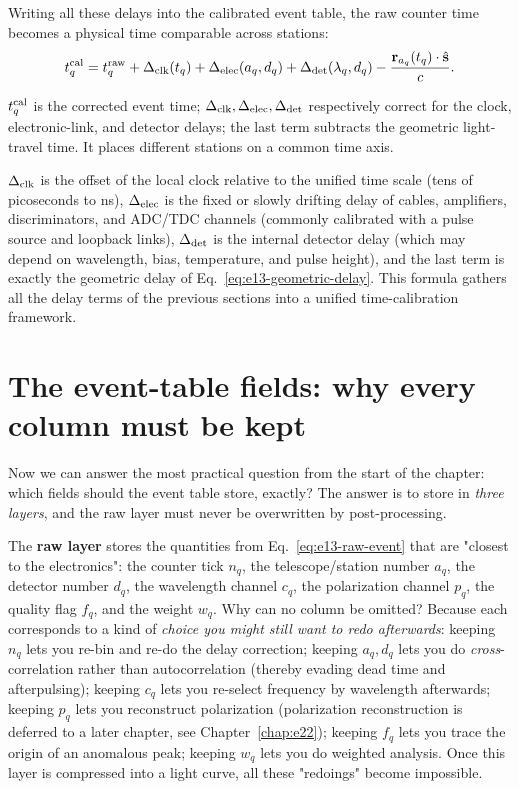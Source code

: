 Writing all these delays into the calibrated event table, the raw counter time becomes a physical time comparable across stations:
\begin{equation}
  t^{\rm cal}_q =
  t^{\rm raw}_q
  +\Delta_{\rm clk}(t_q)
  +\Delta_{\rm elec}(a_q,d_q)
  +\Delta_{\rm det}(\lambda_q,d_q)
  -\frac{\mathbf{r}_{a_q}(t_q)\cdot\hat{\mathbf{s}}}{c}.
  \label{eq:e13-calibrated-time}
\end{equation}
\begin{formulaexplain}
$t_q^{\rm cal}$ is the corrected event time; $\Delta_{\rm clk},\Delta_{\rm elec},\Delta_{\rm det}$ respectively correct for the clock, electronic-link, and detector delays; the last term subtracts the geometric light-travel time. It places different stations on a common time axis.
\end{formulaexplain}
$\Delta_{\rm clk}$ is the offset of the local clock relative to the unified time scale (tens of picoseconds to ns), $\Delta_{\rm elec}$ is the fixed or slowly drifting delay of cables, amplifiers, discriminators, and ADC/TDC channels (commonly calibrated with a pulse source and loopback links), $\Delta_{\rm det}$ is the internal detector delay (which may depend on wavelength, bias, temperature, and pulse height), and the last term is exactly the geometric delay of Eq.~\eqref{eq:e13-geometric-delay}. This formula gathers all the delay terms of the previous sections into a unified time-calibration framework.

\section{The event-table fields: why every column must be kept}
\label{sec:e13-schema}

Now we can answer the most practical question from the start of the chapter: which fields should the event table store, exactly? The answer is to store in \emph{three layers}, and the raw layer must never be overwritten by post-processing.

The \textbf{raw layer} stores the quantities from Eq.~\eqref{eq:e13-raw-event} that are "closest to the electronics": the counter tick $n_q$, the telescope/station number $a_q$, the detector number $d_q$, the wavelength channel $c_q$, the polarization channel $p_q$, the quality flag $f_q$, and the weight $w_q$. Why can no column be omitted? Because each corresponds to a kind of \emph{choice you might still want to redo afterwards}: keeping $n_q$ lets you re-bin and re-do the delay correction; keeping $a_q,d_q$ lets you do \emph{cross}-correlation rather than autocorrelation (thereby evading dead time and afterpulsing); keeping $c_q$ lets you re-select frequency by wavelength afterwards; keeping $p_q$ lets you reconstruct polarization (polarization reconstruction is deferred to a later chapter, see Chapter~\ref{chap:e22}); keeping $f_q$ lets you trace the origin of an anomalous peak; keeping $w_q$ lets you do weighted analysis. Once this layer is compressed into a light curve, all these "redoings" become impossible.

